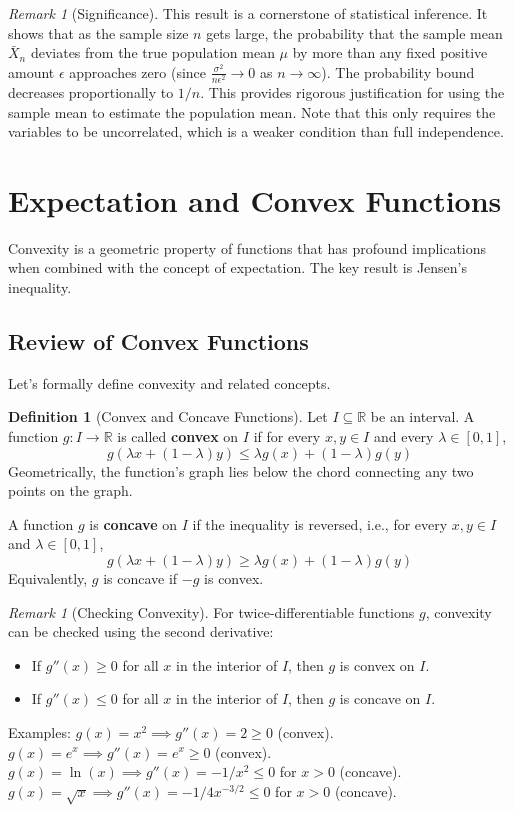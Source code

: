 \documentclass[11pt, letterpaper]{article}
\theoremstyle{plain} %
\theoremstyle{definition} %
\newtheorem{definition}[theorem]{Definition}
\theoremstyle{remark} %
\newtheorem{remark}[theorem]{Remark}
\newcommand{\R}{\mathbb{R}} %
\begin{document}
\begin{remark}[Significance]
This result is a cornerstone of statistical inference. It shows that as the sample size $n$ gets large, the probability that the sample mean $\bar{X}_n$ deviates from the true population mean $\mu$ by more than any fixed positive amount $\epsilon$ approaches zero (since $\frac{\sigma^2}{n\epsilon^2} \to 0$ as $n \to \infty$). The probability bound decreases proportionally to $1/n$. This provides rigorous justification for using the sample mean to estimate the population mean. Note that this only requires the variables to be uncorrelated, which is a weaker condition than full independence.
\end{remark}

\section{Expectation and Convex Functions}

Convexity is a geometric property of functions that has profound implications when combined with the concept of expectation. The key result is Jensen's inequality.

\subsection{Review of Convex Functions}

Let's formally define convexity and related concepts.

\begin{definition}[Convex and Concave Functions] \label{def:convex}
Let $I \subseteq \R$ be an interval. A function $g: I \to \R$ is called \textbf{convex} on $I$ if for every $x, y \in I$ and every $\lambda \in [0, 1]$,
\[
g(\lambda x + (1 - \lambda) y) \le \lambda g(x) + (1 - \lambda) g(y)
\]
Geometrically, the function's graph lies below the chord connecting any two points on the graph.

A function $g$ is \textbf{concave} on $I$ if the inequality is reversed, i.e., for every $x, y \in I$ and $\lambda \in [0, 1]$,
\[
g(\lambda x + (1 - \lambda) y) \ge \lambda g(x) + (1 - \lambda) g(y)
\]
Equivalently, $g$ is concave if $-g$ is convex.
\end{definition}

\begin{remark}[Checking Convexity]
For twice-differentiable functions $g$, convexity can be checked using the second derivative:
\begin{itemize}
    \item If $g''(x) \ge 0$ for all $x$ in the interior of $I$, then $g$ is convex on $I$.
    \item If $g''(x) \le 0$ for all $x$ in the interior of $I$, then $g$ is concave on $I$.
\end{itemize}
Examples: $g(x)=x^2 \implies g''(x)=2 \ge 0$ (convex). $g(x)=e^x \implies g''(x)=e^x \ge 0$ (convex). $g(x)=\ln(x) \implies g''(x)=-1/x^2 \le 0$ for $x>0$ (concave). $g(x)=\sqrt{x} \implies g''(x)=-1/4 x^{-3/2} \le 0$ for $x>0$ (concave).
\end{remark}
\end{document}
